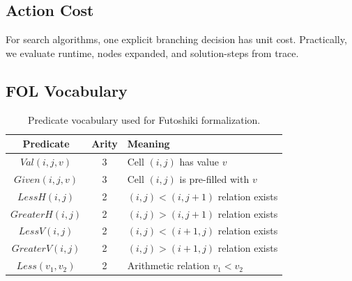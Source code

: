 \documentclass[12pt,a4paper]{article}
\begin{document}
\subsection{Action Cost}
For search algorithms, one explicit branching decision has unit cost.  
Practically, we evaluate runtime, nodes expanded, and solution-steps from trace.

\subsection{FOL Vocabulary}
\begin{table}[H]
\centering
\renewcommand{\arraystretch}{1.3}
\begin{tabular}{|c|c|l|}
\hline
\textbf{Predicate} & \textbf{Arity} & \textbf{Meaning} \\
\hline
$Val(i,j,v)$ & 3 & Cell $(i,j)$ has value $v$ \\
$Given(i,j,v)$ & 3 & Cell $(i,j)$ is pre-filled with $v$ \\
$LessH(i,j)$ & 2 & $(i,j) < (i,j+1)$ relation exists \\
$GreaterH(i,j)$ & 2 & $(i,j) > (i,j+1)$ relation exists \\
$LessV(i,j)$ & 2 & $(i,j) < (i+1,j)$ relation exists \\
$GreaterV(i,j)$ & 2 & $(i,j) > (i+1,j)$ relation exists \\
$Less(v_1,v_2)$ & 2 & Arithmetic relation $v_1 < v_2$ \\
\hline
\end{tabular}
\caption{Predicate vocabulary used for Futoshiki formalization.}
\end{table}
\end{document}
